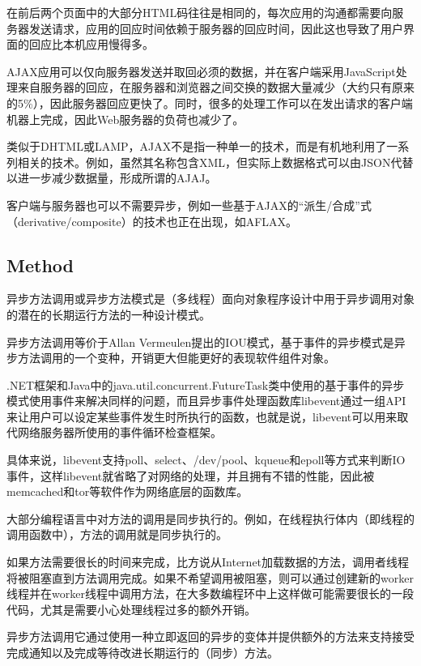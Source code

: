 在前后两个页面中的大部分HTML码往往是相同的，每次应用的沟通都需要向服务器发送请求，应用的回应时间依赖于服务器的回应时间，因此这也导致了用户界面的回应比本机应用慢得多。

AJAX应用可以仅向服务器发送并取回必须的数据，并在客户端采用JavaScript处理来自服务器的回应，在服务器和浏览器之间交换的数据大量减少（大约只有原来的5\%），因此服务器回应更快了。同时，很多的处理工作可以在发出请求的客户端机器上完成，因此Web服务器的负荷也减少了。

类似于DHTML或LAMP，AJAX不是指一种单一的技术，而是有机地利用了一系列相关的技术。例如，虽然其名称包含XML，但实际上数据格式可以由JSON代替以进一步减少数据量，形成所谓的AJAJ。

客户端与服务器也可以不需要异步，例如一些基于AJAX的“派生/合成”式（derivative/composite）的技术也正在出现，如AFLAX。





\subsection{Method}

异步方法调用或异步方法模式是（多线程）面向对象程序设计中用于异步调用对象的潜在的长期运行方法的一种设计模式。

异步方法调用等价于Allan Vermeulen提出的IOU模式，基于事件的异步模式是异步方法调用的一个变种，开销更大但能更好的表现软件组件对象。

.NET框架和Java中的java.util.concurrent.FutureTask类中使用的基于事件的异步模式使用事件来解决同样的问题，而且异步事件处理函数库libevent通过一组API来让用户可以设定某些事件发生时所执行的函数，也就是说，libevent可以用来取代网络服务器所使用的事件循环检查框架。



具体来说，libevent支持poll、select、/dev/pool、kqueue和epoll等方式来判断IO事件，这样libevent就省略了对网络的处理，并且拥有不错的性能，因此被memcached和tor等软件作为网络底层的函数库。

大部分编程语言中对方法的调用是同步执行的。例如，在线程执行体内（即线程的调用函数中），方法的调用就是同步执行的。

如果方法需要很长的时间来完成，比方说从Internet加载数据的方法，调用者线程将被阻塞直到方法调用完成。如果不希望调用被阻塞，则可以通过创建新的worker线程并在worker线程中调用方法，在大多数编程环中上这样做可能需要很长的一段代码，尤其是需要小心处理线程过多的额外开销。

异步方法调用它通过使用一种立即返回的异步的变体并提供额外的方法来支持接受完成通知以及完成等待改进长期运行的（同步）方法。

